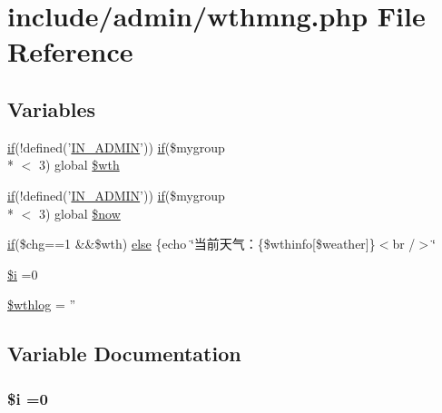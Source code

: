 \hypertarget{wthmng_8php}{\section{include/admin/wthmng.php File Reference}
\label{wthmng_8php}
}
\subsection*{Variables}
\begin{DoxyCompactItemize}
\item 
\hyperlink{login__old_8php_a4ac1118c2e44c513a674bc1793ba6c90}{if}(!defined('\hyperlink{admin_8php_ad49472b0cdee543164375bf133a537f1}{I\+N\+\_\+\+A\+D\+M\+I\+N}')) \hyperlink{login__old_8php_a4ac1118c2e44c513a674bc1793ba6c90}{if}(\$mygroup\\*
$<$ 3) global \hyperlink{wthmng_8php_ad5e52a89d9e0b69141263b4677e63da8}{\$wth}
\item 
\hyperlink{login__old_8php_a4ac1118c2e44c513a674bc1793ba6c90}{if}(!defined('\hyperlink{admin_8php_ad49472b0cdee543164375bf133a537f1}{I\+N\+\_\+\+A\+D\+M\+I\+N}')) \hyperlink{login__old_8php_a4ac1118c2e44c513a674bc1793ba6c90}{if}(\$mygroup\\*
$<$ 3) global \hyperlink{wthmng_8php_a9a83b1733625446c9ee0a3948de6361e}{\$now}
\item 
\hyperlink{login__old_8php_a4ac1118c2e44c513a674bc1793ba6c90}{if}(\$chg==1 \&\&\$wth) \hyperlink{wthmng_8php_a44a6fc063fac259f71ad7ffa0cd87dbc}{else} \{echo \char`\"{}当前天气：\{\$wthinfo\mbox{[}\$weather\mbox{]}\}$<$br /$>$\char`\"{}
\item 
\hyperlink{wthmng_8php_a83018d9153d17d91fbcf3bc10158d34f}{\$i} =0
\item 
\hyperlink{wthmng_8php_a05660d8a804cda83148122637b2e749f}{\$wthlog} = ''
\end{DoxyCompactItemize}


\subsection{Variable Documentation}
\hypertarget{wthmng_8php_a83018d9153d17d91fbcf3bc10158d34f}{
\subsubsection[{\$i}]{\setlength{\rightskip}{0pt plus 5cm}\$i =0}}\label{wthmng_8php_a83018d9153d17d91fbcf3bc10158d34f}


